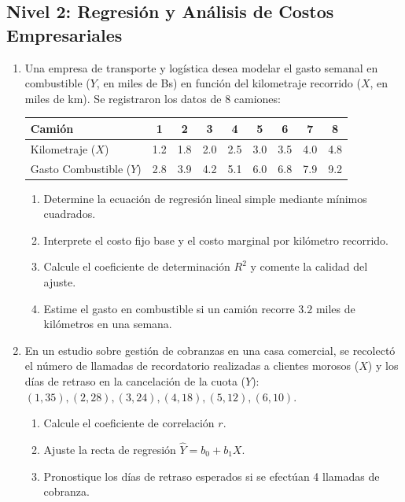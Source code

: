 \subsection*{Nivel 2: Regresión y Análisis de Costos Empresariales}
\begin{enumerate}[resume]
    \item Una empresa de transporte y logística desea modelar el gasto semanal en combustible ($Y$, en miles de Bs) en función del kilometraje recorrido ($X$, en miles de km). Se registraron los datos de 8 camiones:
    \begin{center}
    \begin{tabular}{l|cccccccc}
    \toprule
    Camión & 1 & 2 & 3 & 4 & 5 & 6 & 7 & 8 \\
    \midrule
    Kilometraje ($X$) & 1.2 & 1.8 & 2.0 & 2.5 & 3.0 & 3.5 & 4.0 & 4.8 \\
    Gasto Combustible ($Y$) & 2.8 & 3.9 & 4.2 & 5.1 & 6.0 & 6.8 & 7.9 & 9.2 \\
    \bottomrule
    \end{tabular}
    \end{center}
    \begin{enumerate}
        \item Determine la ecuación de regresión lineal simple mediante mínimos cuadrados.
        \item Interprete el costo fijo base y el costo marginal por kilómetro recorrido.
        \item Calcule el coeficiente de determinación $R^2$ y comente la calidad del ajuste.
        \item Estime el gasto en combustible si un camión recorre $3.2$ miles de kilómetros en una semana.
    \end{enumerate}

    \item En un estudio sobre gestión de cobranzas en una casa comercial, se recolectó el número de llamadas de recordatorio realizadas a clientes morosos ($X$) y los días de retraso en la cancelación de la cuota ($Y$):
    $(1, 35), (2, 28), (3, 24), (4, 18), (5, 12), (6, 10)$.
    \begin{enumerate}
        \item Calcule el coeficiente de correlación $r$.
        \item Ajuste la recta de regresión $\hat{Y} = b_0 + b_1 X$.
        \item Pronostique los días de retraso esperados si se efectúan 4 llamadas de cobranza.
    \end{enumerate}
\end{enumerate}


